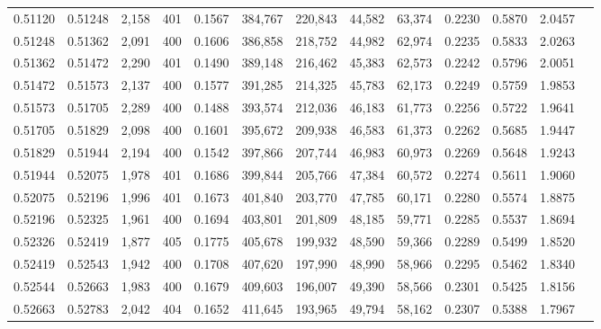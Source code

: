 \begin{tabular}{rrrrrrrrrrrrr}
0.51120 & 0.51248 & 2,158 & 401 &                                     0.1567 & 384,767 & 220,843 &  44,582 &  63,374 & 0.2230 & 0.5870 & 2.0457 \\
0.51248 & 0.51362 & 2,091 & 400 &                                     0.1606 & 386,858 & 218,752 &  44,982 &  62,974 & 0.2235 & 0.5833 & 2.0263 \\
0.51362 & 0.51472 & 2,290 & 401 &                                     0.1490 & 389,148 & 216,462 &  45,383 &  62,573 & 0.2242 & 0.5796 & 2.0051 \\
0.51472 & 0.51573 & 2,137 & 400 &                                     0.1577 & 391,285 & 214,325 &  45,783 &  62,173 & 0.2249 & 0.5759 & 1.9853 \\
0.51573 & 0.51705 & 2,289 & 400 &                                     0.1488 & 393,574 & 212,036 &  46,183 &  61,773 & 0.2256 & 0.5722 & 1.9641 \\
0.51705 & 0.51829 & 2,098 & 400 &                                     0.1601 & 395,672 & 209,938 &  46,583 &  61,373 & 0.2262 & 0.5685 & 1.9447 \\
0.51829 & 0.51944 & 2,194 & 400 &                                     0.1542 & 397,866 & 207,744 &  46,983 &  60,973 & 0.2269 & 0.5648 & 1.9243 \\
0.51944 & 0.52075 & 1,978 & 401 &                                     0.1686 & 399,844 & 205,766 &  47,384 &  60,572 & 0.2274 & 0.5611 & 1.9060 \\
0.52075 & 0.52196 & 1,996 & 401 &                                     0.1673 & 401,840 & 203,770 &  47,785 &  60,171 & 0.2280 & 0.5574 & 1.8875 \\
0.52196 & 0.52325 & 1,961 & 400 &                                     0.1694 & 403,801 & 201,809 &  48,185 &  59,771 & 0.2285 & 0.5537 & 1.8694 \\
0.52326 & 0.52419 & 1,877 & 405 &                                     0.1775 & 405,678 & 199,932 &  48,590 &  59,366 & 0.2289 & 0.5499 & 1.8520 \\
0.52419 & 0.52543 & 1,942 & 400 &                                     0.1708 & 407,620 & 197,990 &  48,990 &  58,966 & 0.2295 & 0.5462 & 1.8340 \\
0.52544 & 0.52663 & 1,983 & 400 &                                     0.1679 & 409,603 & 196,007 &  49,390 &  58,566 & 0.2301 & 0.5425 & 1.8156 \\
0.52663 & 0.52783 & 2,042 & 404 &                                     0.1652 & 411,645 & 193,965 &  49,794 &  58,162 & 0.2307 & 0.5388 & 1.7967 \\

\end{tabular}
